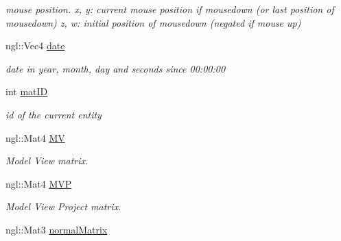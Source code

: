 \begin{DoxyCompactItemize}
\begin{DoxyCompactList}\small\item\em mouse position. x, y\-: current mouse position if mousedown (or last position of mousedown) z, w\-: initial position of mousedown (negated if mouse up) \end{DoxyCompactList}\item 
\hypertarget{struct_shader_variables_a37ac5fa9b173ad917a5dbb1a3007f59f}{ngl\-::\-Vec4 \hyperlink{struct_shader_variables_a37ac5fa9b173ad917a5dbb1a3007f59f}{date}}\label{struct_shader_variables_a37ac5fa9b173ad917a5dbb1a3007f59f}

\begin{DoxyCompactList}\small\item\em date in year, month, day and seconds since 00\-:00\-:00 \end{DoxyCompactList}\item 
\hypertarget{struct_shader_variables_a4e46780de60b67bc48191fc56ffa9b4b}{int \hyperlink{struct_shader_variables_a4e46780de60b67bc48191fc56ffa9b4b}{mat\-I\-D}}\label{struct_shader_variables_a4e46780de60b67bc48191fc56ffa9b4b}

\begin{DoxyCompactList}\small\item\em id of the current entity \end{DoxyCompactList}\item 
\hypertarget{struct_shader_variables_a1243e729cad6636c1ec7f1f021c36486}{ngl\-::\-Mat4 \hyperlink{struct_shader_variables_a1243e729cad6636c1ec7f1f021c36486}{M\-V}}\label{struct_shader_variables_a1243e729cad6636c1ec7f1f021c36486}

\begin{DoxyCompactList}\small\item\em Model View matrix. \end{DoxyCompactList}\item 
\hypertarget{struct_shader_variables_a6e16012fe625f281a4e59c804fec3ad9}{ngl\-::\-Mat4 \hyperlink{struct_shader_variables_a6e16012fe625f281a4e59c804fec3ad9}{M\-V\-P}}\label{struct_shader_variables_a6e16012fe625f281a4e59c804fec3ad9}

\begin{DoxyCompactList}\small\item\em Model View Project matrix. \end{DoxyCompactList}\item 
\hypertarget{struct_shader_variables_a676818ef1a5d0c2f196f8c9fc2e26552}{ngl\-::\-Mat3 \hyperlink{struct_shader_variables_a676818ef1a5d0c2f196f8c9fc2e26552}{normal\-Matrix}}\label{struct_shader_variables_a676818ef1a5d0c2f196f8c9fc2e26552}


\end{DoxyCompactItemize}
